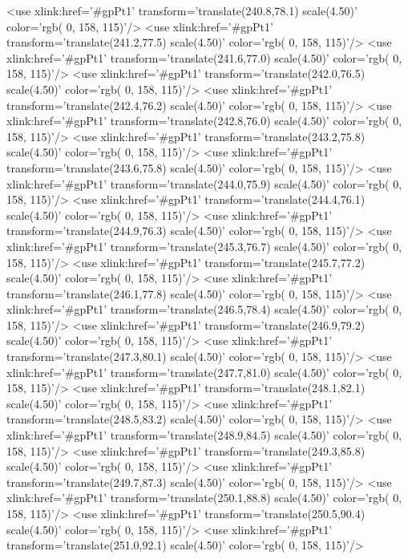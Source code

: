 	<use xlink:href='#gpPt1' transform='translate(240.8,78.1) scale(4.50)' color='rgb(  0, 158, 115)'/>
	<use xlink:href='#gpPt1' transform='translate(241.2,77.5) scale(4.50)' color='rgb(  0, 158, 115)'/>
	<use xlink:href='#gpPt1' transform='translate(241.6,77.0) scale(4.50)' color='rgb(  0, 158, 115)'/>
	<use xlink:href='#gpPt1' transform='translate(242.0,76.5) scale(4.50)' color='rgb(  0, 158, 115)'/>
	<use xlink:href='#gpPt1' transform='translate(242.4,76.2) scale(4.50)' color='rgb(  0, 158, 115)'/>
	<use xlink:href='#gpPt1' transform='translate(242.8,76.0) scale(4.50)' color='rgb(  0, 158, 115)'/>
	<use xlink:href='#gpPt1' transform='translate(243.2,75.8) scale(4.50)' color='rgb(  0, 158, 115)'/>
	<use xlink:href='#gpPt1' transform='translate(243.6,75.8) scale(4.50)' color='rgb(  0, 158, 115)'/>
	<use xlink:href='#gpPt1' transform='translate(244.0,75.9) scale(4.50)' color='rgb(  0, 158, 115)'/>
	<use xlink:href='#gpPt1' transform='translate(244.4,76.1) scale(4.50)' color='rgb(  0, 158, 115)'/>
	<use xlink:href='#gpPt1' transform='translate(244.9,76.3) scale(4.50)' color='rgb(  0, 158, 115)'/>
	<use xlink:href='#gpPt1' transform='translate(245.3,76.7) scale(4.50)' color='rgb(  0, 158, 115)'/>
	<use xlink:href='#gpPt1' transform='translate(245.7,77.2) scale(4.50)' color='rgb(  0, 158, 115)'/>
	<use xlink:href='#gpPt1' transform='translate(246.1,77.8) scale(4.50)' color='rgb(  0, 158, 115)'/>
	<use xlink:href='#gpPt1' transform='translate(246.5,78.4) scale(4.50)' color='rgb(  0, 158, 115)'/>
	<use xlink:href='#gpPt1' transform='translate(246.9,79.2) scale(4.50)' color='rgb(  0, 158, 115)'/>
	<use xlink:href='#gpPt1' transform='translate(247.3,80.1) scale(4.50)' color='rgb(  0, 158, 115)'/>
	<use xlink:href='#gpPt1' transform='translate(247.7,81.0) scale(4.50)' color='rgb(  0, 158, 115)'/>
	<use xlink:href='#gpPt1' transform='translate(248.1,82.1) scale(4.50)' color='rgb(  0, 158, 115)'/>
	<use xlink:href='#gpPt1' transform='translate(248.5,83.2) scale(4.50)' color='rgb(  0, 158, 115)'/>
	<use xlink:href='#gpPt1' transform='translate(248.9,84.5) scale(4.50)' color='rgb(  0, 158, 115)'/>
	<use xlink:href='#gpPt1' transform='translate(249.3,85.8) scale(4.50)' color='rgb(  0, 158, 115)'/>
	<use xlink:href='#gpPt1' transform='translate(249.7,87.3) scale(4.50)' color='rgb(  0, 158, 115)'/>
	<use xlink:href='#gpPt1' transform='translate(250.1,88.8) scale(4.50)' color='rgb(  0, 158, 115)'/>
	<use xlink:href='#gpPt1' transform='translate(250.5,90.4) scale(4.50)' color='rgb(  0, 158, 115)'/>
	<use xlink:href='#gpPt1' transform='translate(251.0,92.1) scale(4.50)' color='rgb(  0, 158, 115)'/>
